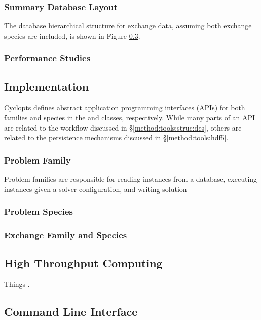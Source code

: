 
\subsubsection{Summary Database Layout}

The database hierarchical structure for exchange data, assuming both exchange
species are included, is shown in Figure \ref{}.

\subsubsection{Performance Studies}\label{method:tools:hdf5:study}

\subsection{Implementation}

Cyclopts defines abstract application programming interfaces (APIs) for both
families and species in the  and 
classes, respectively. While many parts of an API are related to the workflow
discussed in \S \ref{method:tools:struc:des}, others are related to the
persistence mechanisms discussed in \S \ref{method:tools:hdf5}.

\subsubsection{Problem Family}

Problem families are responsible for reading instances from a database, executing instances given a solver configuration, and writing solution 

\subsubsection{Problem Species}
 
\subsubsection{Exchange Family and Species}

\subsection{High Throughput Computing}\label{method:tools:htc}

Things \cite{bui_work_2011}.

\subsection{Command Line Interface}
